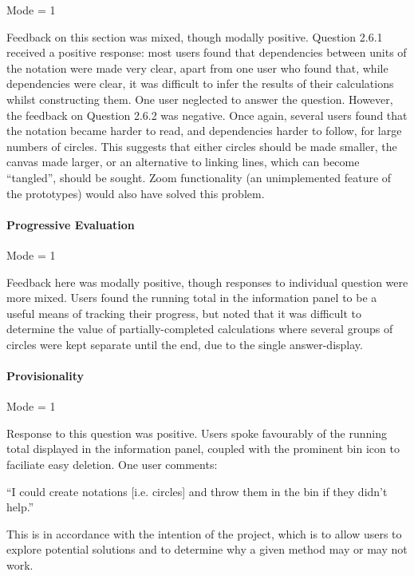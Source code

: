 \documentclass[12pt,twoside,notitlepage,xetex]{report}
\begin{document}
Mode = 1

Feedback on this section was mixed, though modally positive.  Question 2.6.1 received a positive response: most users found that dependencies between units of the notation were made very clear, apart from one user who found that, while dependencies were clear, it was difficult to infer the results of their calculations whilst constructing them.  One user neglected to answer the question.  However, the feedback on Question 2.6.2 was negative.  Once again, several users found that the notation became harder to read, and dependencies harder to follow, for large numbers of circles.  This suggests that either circles should be made smaller, the canvas made larger, or an alternative to linking lines, which can become ``tangled'', should be sought.  Zoom functionality (an unimplemented feature of the prototypes) would also have solved this problem.

\paragraph{Progressive Evaluation}\hfill

Mode = 1

Feedback here was modally positive, though responses to individual question were more mixed.  Users found the running total in the information panel to be a useful means of tracking their progress, but noted that it was difficult to determine the value of partially-completed calculations where several groups of circles were kept separate until the end, due to the single answer-display.

\paragraph{Provisionality}\hfill

Mode = 1

Response to this question was positive.  Users spoke favourably of the running total displayed in the information panel, coupled with the prominent bin icon to faciliate easy deletion.  One user comments:
\begin{center}
\parbox[c]{\textwidth-2cm}{
\small
``I could create notations [i.e. circles] and throw them in the bin if they didn't help.''
}
\end{center}
This is in accordance with the intention of the project, which is to allow users to explore potential solutions and to determine why a given method may or may not work.
\end{document}
